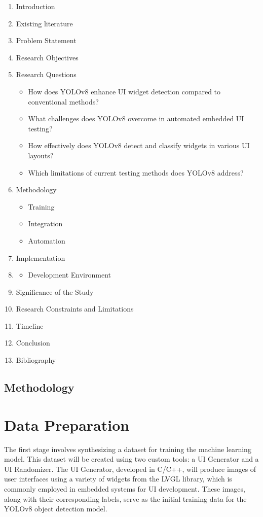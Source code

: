 \documentclass[Proposal,BIC,english,fhCitStyle,IEEE]{BASE/twbook} %
\begin{document}
\begin{enumerate}
    \item Introduction
    \item Existing literature
    \item Problem Statement
    \item Research Objectives
    \item Research Questions
          \begin{itemize}
              \item How does YOLOv8 enhance UI widget detection compared to conventional methods?
              \item What challenges does YOLOv8 overcome in automated embedded UI testing?
              \item How effectively does YOLOv8 detect and classify widgets in various UI layouts?
              \item Which limitations of current testing methods does YOLOv8 address?
          \end{itemize}
    \item Methodology
          \begin{itemize}
              \item Training
              \item Integration
              \item Automation
          \end{itemize}
    \item Implementation
    \item \begin{itemize}
              \item Development Environment
          \end{itemize}
    \item Significance of the Study
    \item Research Constraints and Limitations
    \item Timeline
    \item Conclusion
    \item Bibliography
\end{enumerate}

\section{Methodology}
\chapter{Data Preparation}
The first stage involves synthesizing a dataset for training the machine learning model. This dataset will be created using two custom tools: a UI Generator and a UI Randomizer. The UI Generator, developed in C/C++, will produce images of user interfaces using a variety of widgets from the LVGL library, which is commonly employed in embedded systems for UI development. These images, along with their corresponding labels, serve as the initial training data for the YOLOv8 object detection model.
\end{document}
